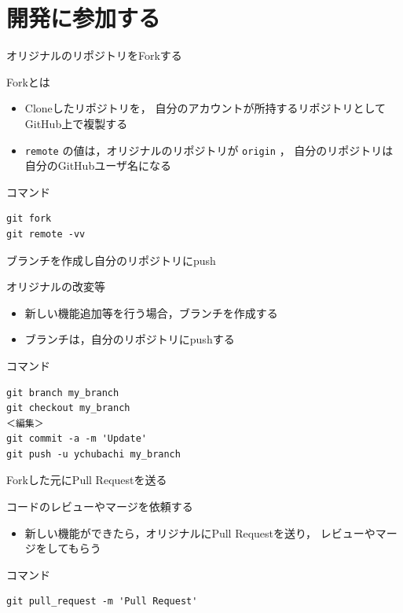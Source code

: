 \documentclass[t, aspectratio=169]{beamer}
\begin{document}
\section{開発に参加する}
\label{sec-4-2}
\begin{frame}[fragile,label=sec-4-2-1]{オリジナルのリポジトリをForkする}
 \begin{block}{Forkとは}
\begin{itemize}
\item Cloneしたリポジトリを，
自分のアカウントが所持するリポジトリとして
GitHub上で複製する
\item \texttt{remote} の値は，オリジナルのリポジトリが \texttt{origin} ，
自分のリポジトリは自分のGitHubユーザ名になる
\end{itemize}
\end{block}

\begin{block}{コマンド}
\begin{verbatim}
git fork
git remote -vv
\end{verbatim}
\end{block}
\end{frame}
\begin{frame}[fragile,label=sec-4-2-2]{ブランチを作成し自分のリポジトリにpush}
 \begin{block}{オリジナルの改変等}
\begin{itemize}
\item 新しい機能追加等を行う場合，ブランチを作成する
\item ブランチは，自分のリポジトリにpushする
\end{itemize}
\end{block}

\begin{block}{コマンド}
\begin{verbatim}
git branch my_branch
git checkout my_branch
＜編集＞
git commit -a -m 'Update'
git push -u ychubachi my_branch
\end{verbatim}
\end{block}
\end{frame}
\begin{frame}[fragile,label=sec-4-2-3]{Forkした元にPull Requestを送る}
 \begin{block}{コードのレビューやマージを依頼する}
\begin{itemize}
\item 新しい機能ができたら，オリジナルにPull Requestを送り，
レビューやマージをしてもらう
\end{itemize}
\end{block}

\begin{block}{コマンド}
\begin{verbatim}
git pull_request -m 'Pull Request'
\end{verbatim}
\end{block}
\end{frame}
\end{document}
